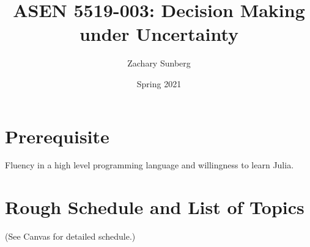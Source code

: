 \documentclass[9pt]{article}
\title{ASEN 5519-003: Decision Making under Uncertainty}
\author{Zachary Sunberg}
\date{Spring 2021}
\begin{document}
\maketitle

\section*{Prerequisite}

Fluency in a high level programming language and willingness to learn Julia.

\section*{Rough Schedule and List of Topics}

(See Canvas for detailed schedule.)
\end{document}
